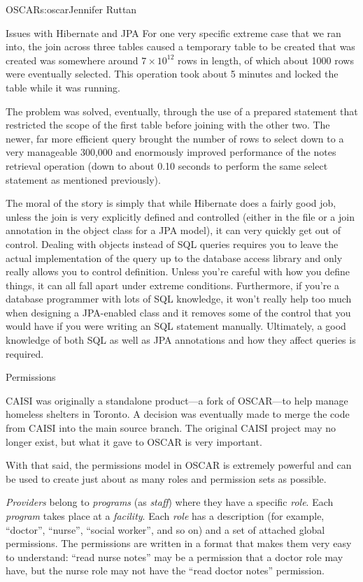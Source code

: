 \begin{aosachapter}{OSCAR}{s:oscar}{Jennifer Ruttan}
\begin{aosasect1}{Issues with Hibernate and JPA}
For one very specific extreme case that we ran into, the join across
three tables caused a temporary table to be created that was created
was somewhere around $7{\times}10^{12}$ rows in length, of which about
1000 rows were eventually selected. This operation took about 5
minutes and locked the  table while it was running.

The problem was solved, eventually, through the use of a prepared
statement that restricted the scope of the first table before joining
with the other two. The newer, far more efficient query brought the
number of rows to select down to a very manageable 300,000 and
enormously improved performance of the notes retrieval operation (down
to about 0.10 seconds to perform the same select statement as
mentioned previously).

The moral of the story is simply that while Hibernate does a fairly
good job, unless the join is very explicitly defined and controlled
(either in the  file or a join annotation in the object class
for a JPA model), it can very quickly get out of control. Dealing with
objects instead of SQL queries requires you to leave the actual
implementation of the query up to the database access library and only
really allows you to control definition. Unless you're careful with
how you define things, it can all fall apart under extreme
conditions. Furthermore, if you're a database programmer with lots of
SQL knowledge, it won't really help too much when designing a
JPA-enabled class and it removes some of the control that you would
have if you were writing an SQL statement manually. Ultimately, a good
knowledge of both SQL as well as JPA annotations and how they affect
queries is required.

\end{aosasect1}

\begin{aosasect1}{Permissions}

CAISI was originally a standalone product---a fork of OSCAR---to help
manage homeless shelters in Toronto. A decision was eventually made to
merge the code from CAISI into the main source branch. The original
CAISI project may no longer exist, but what it gave to OSCAR is very
important.

With that said, the permissions model in OSCAR is extremely powerful
and can be used to create just about as many roles and permission sets
as possible.

\emph{Providers} belong to \emph{programs} (as \emph{staff}) where
they have a specific \emph{role}. Each \emph{program} takes place at
a \emph{facility}. Each \emph{role} has a description (for example,
``doctor'', ``nurse'', ``social worker'', and so on) and a set of
attached global permissions. The permissions are written in a format
that makes them very easy to understand: ``read nurse notes'' may be a
permission that a doctor role may have, but the nurse role may not
have the ``read doctor notes'' permission.


\end{aosasect1}
\end{aosachapter}
